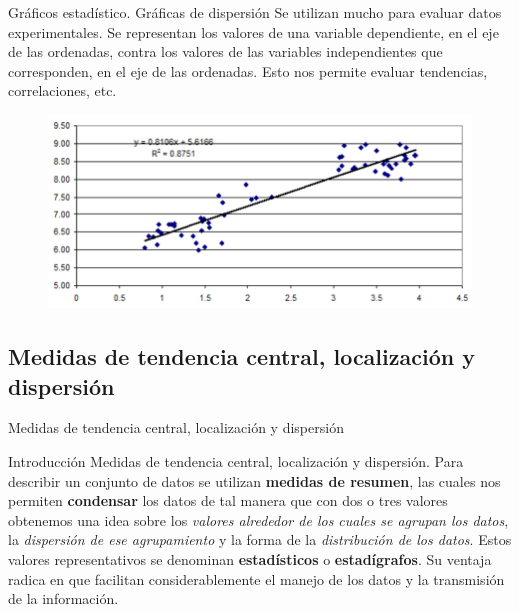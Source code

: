 \documentclass[11pt]{beamer}
\begin{document}
      \begin{frame}{Gráficos estadístico. Gráficas de dispersión}
        Se utilizan mucho para evaluar datos experimentales. Se representan los valores de una variable dependiente, en el eje de las ordenadas, contra los valores de las variables independientes que corresponden, en el eje de las ordenadas. Esto nos permite evaluar tendencias, correlaciones, etc.
        \begin{figure}
            \centering
            \includegraphics[width=0.7\linewidth]{images/graficos_dispersion}
            \label{fig:graficosdispersion}
        \end{figure}
      \end{frame}




    \subsection*{Medidas de tendencia central, localización y dispersión}
      \begin{frame}{}
          \begin{center}
              {\LARGE Medidas de tendencia central, localización y dispersión}
          \end{center}
      \end{frame}
      \begin{frame}{Introducción Medidas de tendencia central, localización y dispersión. }
        Para describir un conjunto de datos se utilizan \textbf{medidas de resumen}, las cuales nos permiten \textbf{condensar} los datos de tal manera que con dos o tres valores obtenemos una idea sobre los \textit{valores alrededor de los cuales se agrupan los datos}, la \textit{dispersión de ese agrupamiento} y la forma de la \textit{distribución de los datos}.
        \pause
        Estos valores representativos se denominan \textbf{estadísticos} o \textbf{estadígrafos}. Su ventaja radica en que facilitan considerablemente el manejo de los datos y la transmisión de la información.
      \end{frame}
\end{document}
